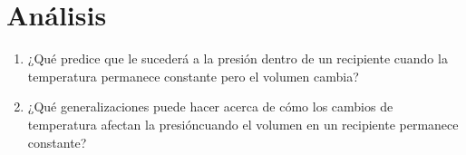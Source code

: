 \documentclass[]{article}
\begin{document}


\newpage
\section{Análisis}
\begin{enumerate}
      \item ¿Qué predice que le sucederá a la presión dentro de un recipiente cuando la temperatura permanece constante pero el volumen cambia?
      \item ¿Qué generalizaciones puede hacer acerca de cómo los cambios de temperatura afectan la presióncuando el volumen en un recipiente permanece constante?
\end{enumerate}













\end{document}
